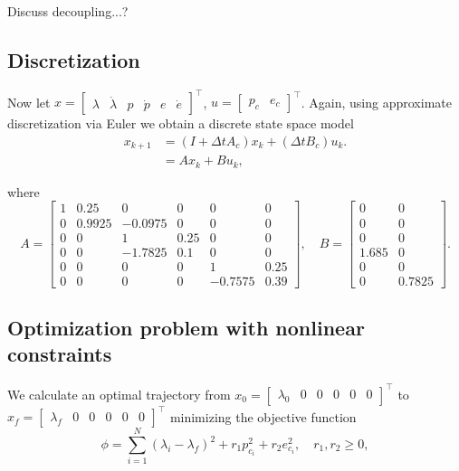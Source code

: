 Discuss decoupling...?

\subsection{Discretization}
Now let $x = \begin{bmatrix}\lambda&\dot{\lambda}&p&\dot{p}&e&\dot{e}\end{bmatrix}^\top$, $u = \begin{bmatrix}p_c&e_c\end{bmatrix}^\top$. Again, using approximate discretization via Euler we obtain a discrete state space model
\begin{subequations}
\begin{align}
	\label{eq:ex_dsys}
	x_{k+1} &= (I + \Delta t A_c) x_k + (\Delta t B_c) u_k. \\
	&= Ax_k + Bu_k,
\end{align}
\end{subequations}

where 
\begin{equation*}
	A = 
	\begin{bmatrix}
		1 & 0.25 & 0 & 0 & 0 & 0\\
		0 & 0.9925 & -0.0975 & 0 & 0 & 0\\
		0 & 0 & 1 & 0.25 & 0 & 0\\
		0 & 0 & -1.7825 & 0.1 & 0 & 0\\
		0 & 0 & 0 & 0 & 1 & 0.25\\
		0 & 0 & 0 & 0 & -0.7575 & 0.39
	\end{bmatrix}, \quad
	B = 
	\begin{bmatrix}
		0 & 0\\
		0 & 0\\
		0 & 0\\
		1.685 & 0\\
		0 & 0\\
		0 & 0.7825
	\end{bmatrix}.
\end{equation*}

\subsection{Optimization problem with nonlinear constraints}

We calculate an optimal trajectory from $x_0 = \begin{bmatrix}\lambda_0&0&0&0&0&0\end{bmatrix}^\top$ to $x_f = \begin{bmatrix}\lambda_f&0&0&0&0&0\end{bmatrix}^\top$ minimizing the objective function 
\begin{equation*}
	\phi = \sum_{i=1}^{N}(\lambda_i - \lambda_f)^2 + r_1 p^2_{c_i} + r_2 e^2_{c_i}, \quad r_1,r_2 \ge 0,
\end{equation*}

